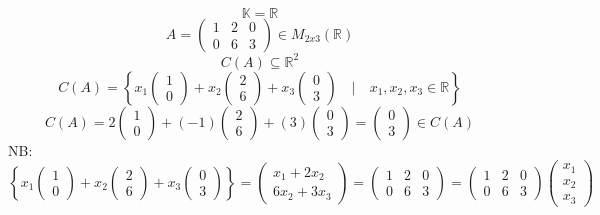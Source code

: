 \documentclass[12pt]{article}
\begin{document}
\[\mathbb{K} = \mathbb{R}\]
\[A = \begin{pmatrix}
    1 & 2& 0\\
    0 & 6 & 3
\end{pmatrix} \in M_{2x3} (\mathbb{R})\]
\[C(A) \subseteq \mathbb{R}^2\]
\[C(A) = \left\{x_1\begin{pmatrix}
    1\\
    0
\end{pmatrix} + x_2\begin{pmatrix}
    2\\
    6
\end{pmatrix} + x_3\begin{pmatrix}
    0\\
    3
\end{pmatrix} \quad | \quad x_1, x_2, x_3 \in \mathbb{R}\right\}\]
\[C(A) = 2\begin{pmatrix}
    1\\
    0
\end{pmatrix} + (-1)\begin{pmatrix}
    2\\
    6
\end{pmatrix} + (3)\begin{pmatrix}
    0\\
    3
\end{pmatrix} = \begin{pmatrix}
    0\\
    3
\end{pmatrix} \in C(A)\]
NB:
\[\left\{x_1\begin{pmatrix}
    1\\
    0
\end{pmatrix} + x_2\begin{pmatrix}
    2\\
    6
\end{pmatrix} + x_3\begin{pmatrix}
    0\\
    3
\end{pmatrix}\right\} = \begin{pmatrix}
    x_1 + 2x_2\\
    6x_2 + 3x_3
\end{pmatrix} = \begin{pmatrix}
    1 & 2 & 0\\
    0 & 6 & 3
\end{pmatrix} = \begin{pmatrix}
    1 & 2 & 0\\
    0 & 6 & 3
\end{pmatrix} \begin{pmatrix}
    x_1\\
    x_2\\
    x_3
\end{pmatrix}\]
\end{document}
